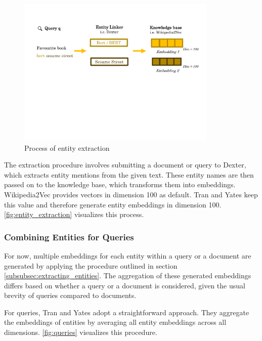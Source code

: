 \begin{figure}[!htb]
    \centering
    \includegraphics[trim={1cm 9cm 1cm 2.5cm}, clip, width=0.85\textwidth]{resources/entity_extraction_2} 
    \caption{Process of entity extraction}
    \label{fig:entity_extraction}
\end{figure}

The extraction procedure involves submitting a document or query to Dexter, which extracts entity mentions from the given text. These entity names are then passed on to the knowledge base, which transforms them into embeddings. Wikipedia2Vec provides vectors in dimension 100 as default. Tran and Yates keep this value and therefore generate entity embeddings in dimension 100. \autoref{fig:entity_extraction} visualizes this process.


\subsubsection{Combining Entities for Queries}\label{subsub:generating_queries}

For now, multiple embeddings for each entity within a query or a document are generated by applying the procedure outlined in section \ref{subsubsec:extracting_entities}. The aggregation of these generated embeddings differs based on whether a query or a document is considered, given the usual brevity of queries compared to documents.

For queries, Tran and Yates adopt a straightforward approach. They aggregate the embeddings of entities by averaging all entity embeddings across all dimensions. \autoref{fig:queries} visualizes this procedure.

